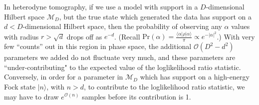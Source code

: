 \documentclass[aps,pra, twocolumn]{revtex4}
\newcommand{\M}{\mathcal{M}}
\begin{document}
In heterodyne tomography, if we use a model with support in a $D$-dimensional Hilbert space $\M_{D}$, but the true state 
which generated the data has support on a $d < D$-dimensional Hilbert space, then the probability of observing any $
\alpha$ values with radius $r > \sqrt{d}$ drops off as $e^{-d}$. (Recall $\mathrm{Pr}(\alpha) = \frac{\langle \alpha | \rho | \alpha\rangle}{\pi}  \propto e^{-|\alpha|^{2}}$.) With very few ``counts'' out in this region in phase space, 
the additional $\mathcal{O}(D^{2}-d^{2})$ parameters we added do not fluctuate very much, and these parameters are 
``under-contributing" to the expected value of the loglikelihood ratio statistic. Conversely, in order for a parameter in $\M_{D}$ which has support on a high-energy Fock state $|n\rangle$, 
with $n > d$, to contribute to the loglikelihood ratio statistic, we may have to draw $e^{\mathcal{O}(n)}$ samples before its contribution is 1. 
\end{document}
